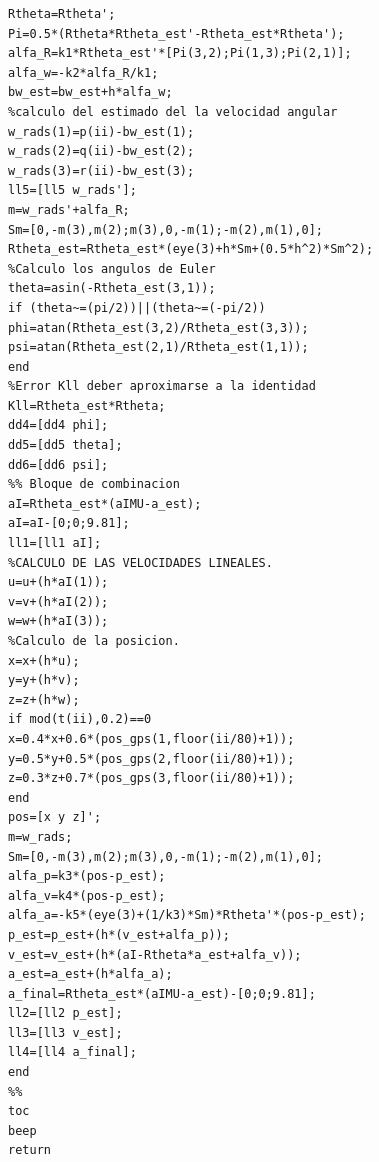 \documentclass[10pt]{report}
\numberwithin{equation}{chapter}
\numberwithin{algorithm}{chapter}
\begin{document}
\begin{lstlisting}[frame=simple]
Rtheta=Rtheta';
Pi=0.5*(Rtheta*Rtheta_est'-Rtheta_est*Rtheta');
alfa_R=k1*Rtheta_est'*[Pi(3,2);Pi(1,3);Pi(2,1)];
alfa_w=-k2*alfa_R/k1;
bw_est=bw_est+h*alfa_w;
%calculo del estimado del la velocidad angular
w_rads(1)=p(ii)-bw_est(1);
w_rads(2)=q(ii)-bw_est(2);
w_rads(3)=r(ii)-bw_est(3);
ll5=[ll5 w_rads'];
m=w_rads'+alfa_R;
Sm=[0,-m(3),m(2);m(3),0,-m(1);-m(2),m(1),0];
Rtheta_est=Rtheta_est*(eye(3)+h*Sm+(0.5*h^2)*Sm^2);
%Calculo los angulos de Euler
theta=asin(-Rtheta_est(3,1)); 
if (theta~=(pi/2))||(theta~=(-pi/2))
phi=atan(Rtheta_est(3,2)/Rtheta_est(3,3));
psi=atan(Rtheta_est(2,1)/Rtheta_est(1,1));
end 
%Error Kll deber aproximarse a la identidad
Kll=Rtheta_est*Rtheta;
dd4=[dd4 phi];
dd5=[dd5 theta];
dd6=[dd6 psi];
%% Bloque de combinacion
aI=Rtheta_est*(aIMU-a_est);
aI=aI-[0;0;9.81];
ll1=[ll1 aI];
%CALCULO DE LAS VELOCIDADES LINEALES.
u=u+(h*aI(1));
v=v+(h*aI(2));
w=w+(h*aI(3));
%Calculo de la posicion.
x=x+(h*u);
y=y+(h*v);
z=z+(h*w);
if mod(t(ii),0.2)==0
x=0.4*x+0.6*(pos_gps(1,floor(ii/80)+1));
y=0.5*y+0.5*(pos_gps(2,floor(ii/80)+1));
z=0.3*z+0.7*(pos_gps(3,floor(ii/80)+1));
end
pos=[x y z]';
m=w_rads;
Sm=[0,-m(3),m(2);m(3),0,-m(1);-m(2),m(1),0];
alfa_p=k3*(pos-p_est);
alfa_v=k4*(pos-p_est);
alfa_a=-k5*(eye(3)+(1/k3)*Sm)*Rtheta'*(pos-p_est);
p_est=p_est+(h*(v_est+alfa_p));
v_est=v_est+(h*(aI-Rtheta*a_est+alfa_v));
a_est=a_est+(h*alfa_a);
a_final=Rtheta_est*(aIMU-a_est)-[0;0;9.81];
ll2=[ll2 p_est];
ll3=[ll3 v_est];
ll4=[ll4 a_final];
end
%%
toc
beep
return
\end{lstlisting}
\end{document}
